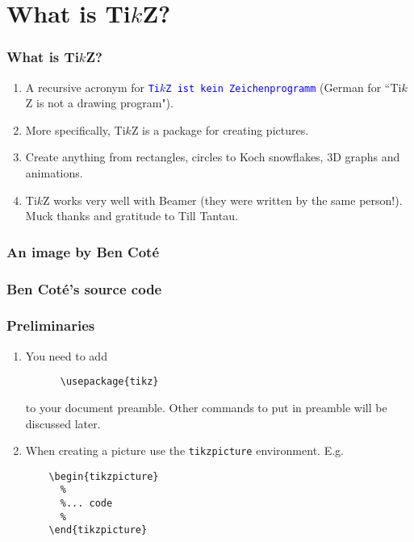 %
%
\section{
  What is Ti$k$Z?
}

%
%
\begin{frame}
  \frametitle{
    What is Ti$k$Z?
  }
  \begin{enumerate}
  \item
    A recursive acronym for \textcolor{blue}{ \tt Ti$k$Z ist kein Zeichenprogramm} (German for ``Ti$k$Z is not a drawing program").
  \item
    More specifically, Ti$k$Z is a package for creating pictures.
  \item
    Create anything from rectangles, circles to Koch snowflakes, 3D graphs and animations.
  \item
    Ti$k$Z works very well with Beamer (they were written by the same person!). Muck thanks and gratitude to Till Tantau.
  \end{enumerate}

\end{frame}

%
%
\begin{frame} 
  \frametitle{
    An image by Ben Cot\'e
}
  
  {
    \tiny
    \begin{center}
      
    \end{center}
  }
  

\end{frame}

%
%
\begin{frame}[fragile]
  \frametitle{
    Ben Cot\'e's source code
  }

  {
    \tiny
    
  }
  
\end{frame}

%
%
\begin{frame}[fragile]
  \frametitle{
    Preliminaries
  }

  \begin{enumerate}
  \item
    You need to add

    \begin{lstlisting}
      \usepackage{tikz}
    \end{lstlisting}

    to your document preamble. Other commands to put in preamble will be discussed later.
  \item
    When creating a picture use the {\tt tikzpicture} environment. E.g.

  \begin{lstlisting}
    \begin{tikzpicture}
      %
      %... code
      %
    \end{tikzpicture}
  \end{lstlisting}
  \end{enumerate}

\end{frame}
